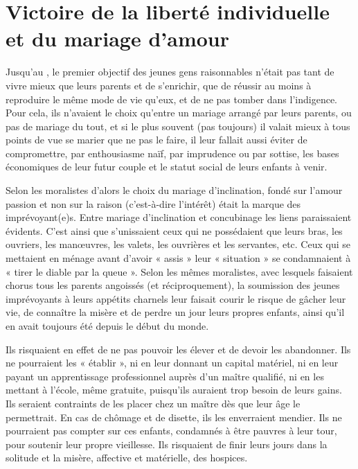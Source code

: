 
\chapter[Victoire de la liberté individuelle et du mariage d'amour]{Victoire de la liberté individuelle\\et du mariage d'amour}


 Jusqu'au , le premier objectif des jeunes gens raisonnables n'était pas tant de vivre mieux que leurs parents et de s'enrichir, que de réussir au moins à reproduire le même mode de vie qu'eux, et de ne pas tomber dans l'indigence. Pour cela, ils n'avaient le choix qu'entre un mariage arrangé par leurs parents, ou pas de mariage du tout, et si le plus souvent (pas toujours) il valait mieux à tous points de vue se marier que ne pas le faire, il leur fallait aussi éviter de compromettre, par enthousiasme naïf, par imprudence ou par sottise, les bases économiques de leur futur couple et le statut social de leurs enfants à venir. 

 Selon les moralistes d'alors le choix du mariage d'inclination, fondé sur l'amour passion et non sur la raison (c'est-à-dire l'intérêt) était la marque des imprévoyant(e)s. Entre mariage d'inclination et concubinage les liens paraissaient évidents. C'est ainsi que s'unissaient ceux qui ne possédaient que leurs bras, les ouvriers, les manœuvres, les valets, les ouvrières et les servantes, etc. Ceux qui se mettaient en ménage avant d'avoir « assis » leur « situation » se condamnaient à « tirer le diable par la queue ». Selon les mêmes moralistes, avec lesquels faisaient chorus tous les parents angoissés (et réciproquement), la soumission des jeunes imprévoyants à leurs appétits charnels leur faisait courir le risque de gâcher leur vie, de connaître la misère et de perdre un jour leurs propres enfants, ainsi qu'il en avait toujours été depuis le début du monde. 

 Ils risquaient en effet de ne pas pouvoir les élever et de devoir les abandonner. Ils ne pourraient les « établir », ni en leur donnant un capital matériel, ni en leur payant un apprentissage professionnel auprès d'un maître qualifié, ni en les mettant à l'école, même gratuite, puisqu'ils auraient trop besoin de leurs gains. Ils seraient contraints de les placer chez un maître dès que leur âge le permettrait. En cas de chômage et de disette, ils les enverraient mendier. Ils ne pourraient pas compter sur ces enfants, condamnés à être pauvres à leur tour, pour soutenir leur propre vieillesse. Ils risquaient de finir leurs jours dans la solitude et la misère, affective et matérielle, des hospices.

